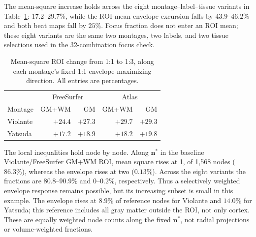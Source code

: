 \documentclass[11pt,a4paper]{article}
\providecommand{\DIFaddtex}[1]{{\protect\color{blue} \sf #1}} %
\providecommand{\DIFaddbegin}{} %
\providecommand{\DIFaddend}{} %
\providecommand{\DIFadd}[1]{\texorpdfstring{\DIFaddtex{#1}}{#1}} %
\begin{document}
\DIFadd{The mean-square increase holds across the eight montage--label--tissue
variants in Table~\ref{tab:fem-mean-variants}: $17.2$--$29.7\%$, while the
ROI-mean envelope excursion falls by $43.9$--$46.2\%$ and both beat maps fall by $25\%$.
Focus fraction does not enter an ROI mean; these eight variants are the
same two montages, two labels, and two tissue selections used in the
32-combination focus check.
}

\begin{table}[htbp]
\color{blue}\centering\small
\caption{\color{blue}Mean-square ROI change from 1:1 to 1:3, along each montage's fixed
1:1 envelope-maximizing direction. All entries are percentages.}
\label{tab:fem-mean-variants}
\begin{tabular}{@{}lrrrr@{}}
\toprule
& \multicolumn{2}{c}{FreeSurfer} & \multicolumn{2}{c}{Atlas}\\
Montage & GM+WM & GM & GM+WM & GM\\
\midrule
Violante & $+24.4$ & $+27.3$ & $+29.7$ & $+29.3$\\
Yatsuda & $+17.2$ & $+18.9$ & $+18.2$ & $+19.8$\\
\bottomrule
\end{tabular}
\end{table}

\DIFadd{The local inequalities hold node by node. Along $\mathbf n^*$ in the
baseline Violante/FreeSurfer GM+WM ROI, mean square rises at 1}\DIFaddend ,\DIFaddbegin \DIFadd{353 of 1,568
nodes ($86.3\%$), whereas the envelope rises at two ($0.13\%$). Across the
eight variants the fractions are $80.8$--$90.9\%$ and $0$--$0.2\%$,
respectively. Thus a selectively weighted envelope response remains possible,
but its increasing subset is small in this example. The envelope rises at
$8.9\%$ of reference nodes for Violante and $14.0\%$ for Yatsuda; this
reference includes all gray matter outside the ROI, not only cortex.
These are equally weighted node counts along the fixed $\mathbf n^*$,
not radial projections or volume-weighted fractions.
}

\fi
\end{document}
